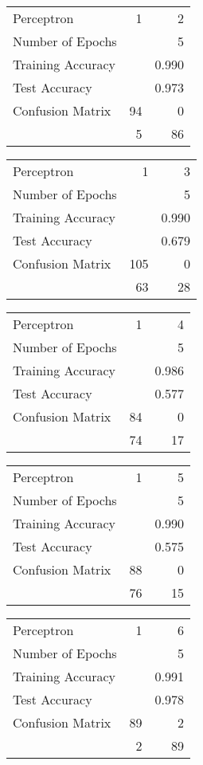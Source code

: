 \documentclass[11pt]{article}
\begin{document}
\begin{minipage}[t]{0.5\textwidth}
\begin{tabular}{|l | r r|}
\hline Perceptron & 1 & 2\\
Number of Epochs & & 5\\
Training Accuracy & & 0.990\\
Test Accuracy & & 0.973\\
Confusion Matrix & 94 & 0\\
 &5 & 86\\ \hline
\end{tabular}
\end{minipage}
\begin{minipage}[t]{0.5\textwidth}
\begin{tabular}{|l | r r|}
\hline Perceptron & 1 & 3\\
Number of Epochs & & 5\\
Training Accuracy & & 0.990\\
Test Accuracy & & 0.679\\
Confusion Matrix & 105 & 0\\
 &63 & 28\\ \hline
\end{tabular}
\end{minipage}
\begin{minipage}[t]{0.5\textwidth}
\begin{tabular}{|l | r r|}
\hline Perceptron & 1 & 4\\
Number of Epochs & & 5\\
Training Accuracy & & 0.986\\
Test Accuracy & & 0.577\\
Confusion Matrix & 84 & 0\\
 &74 & 17\\ \hline
\end{tabular}
\end{minipage}
\begin{minipage}[t]{0.5\textwidth}
\begin{tabular}{|l | r r|}
\hline Perceptron & 1 & 5\\
Number of Epochs & & 5\\
Training Accuracy & & 0.990\\
Test Accuracy & & 0.575\\
Confusion Matrix & 88 & 0\\
 &76 & 15\\ \hline
\end{tabular}
\end{minipage}
\begin{minipage}[t]{0.5\textwidth}
\begin{tabular}{|l | r r|}
\hline Perceptron & 1 & 6\\
Number of Epochs & & 5\\
Training Accuracy & & 0.991\\
Test Accuracy & & 0.978\\
Confusion Matrix & 89 & 2\\
 &2 & 89\\ \hline
\end{tabular}
\end{minipage}
\end{document}
